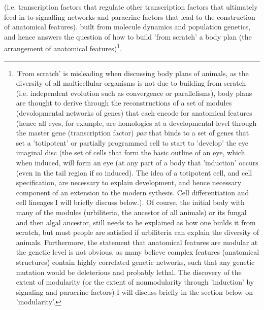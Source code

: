 (i.e. transcription factors that regulate other transcription factors that ultimately feed in to signalling networks and paracrine factors that lead to the construction of anatomical features). built from molecule dynamics and population genetics, and hence answers the question of how to build 'from scratch' a body plan (the arrangement of anatomical features)\footnote{'From scratch' is misleading when discussing body plans of animals, as the diversity of all multicellular organisms is not due to building from scratch (i.e. independent evolution such as convergence or parallelisms), body plans are thought to derive through the reconstructions of a set of modules (devolopmental networks of genes) that each encode for anatomical features (hence all eyes, for example, are homologies at a developmental level through the master gene (transcription factor) \textit{pax} that binds to a set of genes that set a 'totipotent' or partially programmed cell to start to 'develop' the eye imaginal disc (the set of cells that form the basic outline of an eye, which when induced, will form an eye (at any part of a body that 'induction' occurs (even in the tail region if so induced).  The idea of a totipotent cell, and cell specification, are necessary to explain development, and hence necessary component of an extension to the modern sythesis.  Cell differentiation and cell lineages I will briefly discuss below.).  Of course, the initial body with many of the modules (urbiliteria, the ancestor of all animals) or its fungal and then algal ancestor, still needs to be explained as how one builds it from scratch, but must people are satisfied if urbiliteria can explain the diversity of animals.  Furthermore, the statement that anatomical features are modular at the genetic level is not obvious, as many believe complex features (anatomical structures) contain highly correlated genetic networks, such that any genetic mutation would be deleterious and probably lethal.  The discovery of the extent of modularity (or the extent of nonmodularity through 'induction' by signaling and paracrine factors) I will discuss briefly in the section below on 'modularity'.}.        
